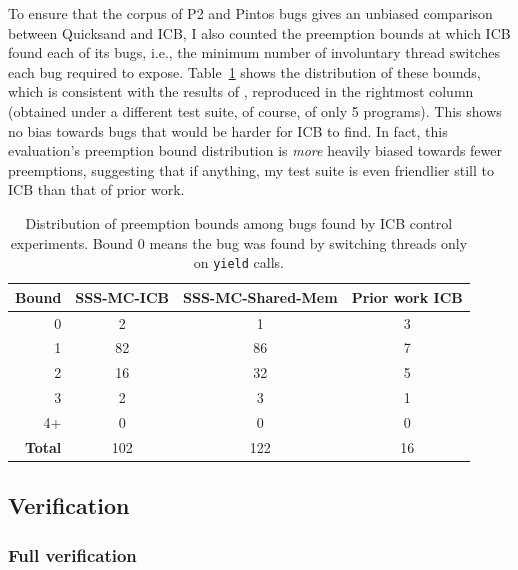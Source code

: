 To ensure that the corpus of P2 and Pintos bugs gives an unbiased comparison between Quicksand and ICB,
I also counted the preemption bounds at which ICB found each of its bugs,
i.e., the minimum number of involuntary thread switches each bug required to expose.
Table~\ref{tab:icb-bounds} shows the distribution of these bounds,
which is consistent with the results of \cite[Table 2]{chess-icb},
reproduced in the rightmost column
(obtained under a different test suite, of course, of only 5 programs).
This shows no bias towards bugs that would be harder for ICB to find.
In fact, this evaluation's preemption bound distribution is {\em more} heavily biased towards fewer preemptions,
suggesting that if anything,
my test suite is even friendlier still to ICB than that of prior work.

\begin{table}[h]
	\begin{center}
		\small
	\begin{tabular}{r||c|c||c}
		{\bf Bound} & {\bf SSS-MC-ICB} & {\bf SSS-MC-Shared-Mem} & {\bf Prior work ICB} \cite{chess-icb} \\
		\hline
		0         & 2     & 1     & 3 \\
		1         & 82    & 86    & 7 \\
		2         & 16    & 32    & 5 \\
		3         & 2     & 3     & 1 \\
		4+        & 0     & 0     & 0 \\
		\hline
		\bf Total & 102   & 122   & 16 \\
	\end{tabular}
	\end{center}
	\caption[Distribution preemption bounds among bugs found by ICB.]
	{Distribution of preemption bounds among bugs found by ICB control experiments.
	Bound 0 means the bug was found by switching threads only on {\tt yield} calls.}
	\label{tab:icb-bounds}
\end{table}


\subsection{Verification}
\label{sec:quicksand-eval-verif}


\subsubsection{Full verification}


